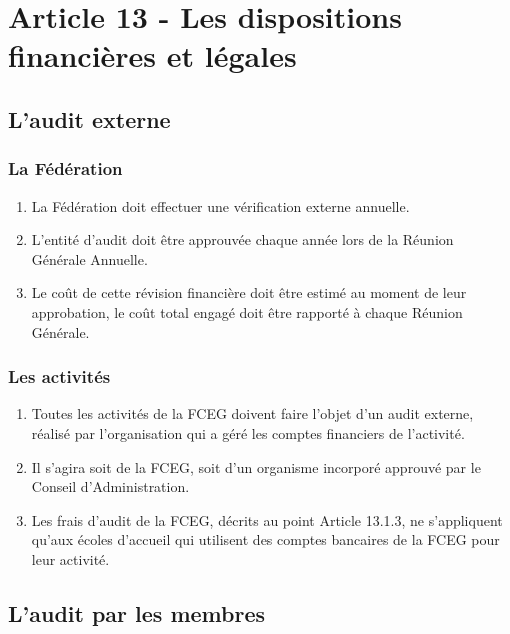 \section{Article 13 - Les dispositions financières et légales}
\label{article-13-les-dispositions-financieres-et-legales}

\subsection{L'audit externe}
\label{laudit-externe}

\subsubsection{La Fédération}
\label{la-federation}

\begin{enumerate}
 \item La Fédération doit effectuer une vérification externe annuelle.
 \item L'entité d'audit doit être approuvée chaque année lors de la Réunion Générale Annuelle.
 \item Le coût de cette révision financière doit être estimé au moment de leur approbation, le coût total engagé doit être rapporté à chaque Réunion Générale.
\end{enumerate}

\subsubsection{Les activités}
\label{les-activites}

\begin{enumerate}
 \item Toutes les activités de la FCEG doivent faire l'objet d'un audit externe, réalisé par l'organisation qui a géré les comptes financiers de l'activité.
 \item Il s'agira soit de la FCEG, soit d'un organisme incorporé approuvé par le Conseil d'Administration.
 \item Les frais d'audit de la FCEG, décrits au point Article 13.1.3, ne s'appliquent qu'aux écoles d'accueil qui utilisent des comptes bancaires de la FCEG pour leur activité.
\end{enumerate}

\subsection{L'audit par les membres}
\label{laudit-par-les-membres}

